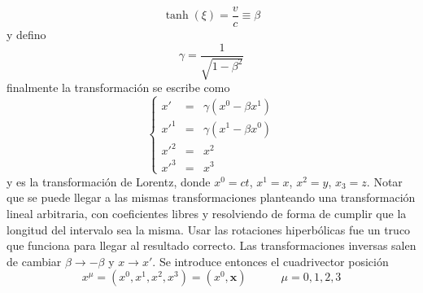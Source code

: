\begin{equation*}
    \tanh{(\xi)} = \frac{v}{c} \equiv \beta
\end{equation*}
y defino 
\begin{equation*}
    \gamma = \frac{1}{\sqrt{1 - \beta^{2}}}
\end{equation*}
finalmente la transformación se escribe como
\begin{equation*}
    \left\{
        \begin{array}{lll}
            x'&=& \gamma (x^{0} - \beta x^{1})\\
            x'^{1}&=& \gamma(x^{1} - \beta x^{0})\\
            x'^{2}&=& x^{2}\\
            x'^{3}&=& x^{3}
        \end{array}
    \right.
\end{equation*}
y es la transformación de Lorentz, donde $x^{0} = ct$, $x^{1} = x$, $x^{2} = y$, $x_{3} = z$. Notar que se puede llegar a las mismas transformaciones planteando una transformación lineal arbitraria, con coeficientes libres y resolviendo de forma de cumplir que la longitud del intervalo sea la misma. Usar las rotaciones hiperbólicas fue un truco que funciona para llegar al resultado correcto. Las transformaciones inversas salen de cambiar $\beta \longrightarrow -\beta$ y $x \longrightarrow x'$. Se introduce entonces el cuadrivector posición 
\begin{equation*}
    x^{\mu} = (x^{0}, x^{1}, x^{2}, x^{3}) = (x^{0}, \textbf{x})\quad\quad\quad
    \mu = 0,1,2,3
\end{equation*}




